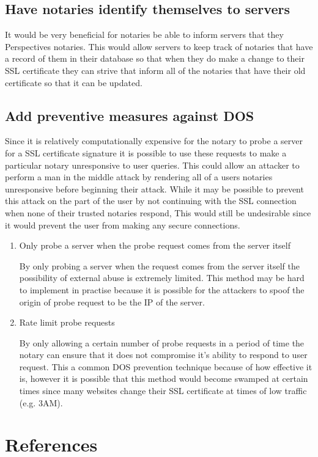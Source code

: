 \documentclass[preprint,review,12pt]{elsarticle}
\begin{document}
\subsection{Have notaries identify themselves to servers}

It would be very beneficial for notaries be able to inform servers that they
Perspectives notaries. This would allow servers to keep track of notaries
that have a record of them in their database so that when they do make a
change to their SSL certificate they can strive that inform all of the
notaries that have their old certificate so that it can be updated.

\subsection{Add preventive measures against DOS}

Since it is relatively computationally expensive for the notary to probe a
server for a SSL certificate signature it is possible to use these requests to
make a particular notary unresponsive to user queries. This could allow an
attacker to perform a man in the middle attack by rendering all of a users
notaries unresponsive before beginning their attack. While it may be possible
to prevent this attack on the part of the user by not continuing with the SSL
connection when none of their trusted notaries respond, This would still be
undesirable since it would prevent the user from making any secure connections.

\begin{enumerate}
    \item {Only probe a server when the probe request comes from the server itself}

        By only probing a server when the request comes from the server itself
        the possibility of external abuse is extremely limited. This method may
        be hard to implement in practise because it is possible for the
        attackers to spoof the origin of probe request to be the IP of the
        server.

    \item {Rate limit probe requests}

        By only allowing a certain number of probe requests in a period of time
        the notary can ensure that it does not compromise it's ability to
        respond to user request. This a common DOS prevention technique because
        of how effective it is, however it is possible that this method would
        become swamped at certain times since many websites change their SSL
        certificate at times of low traffic (e.g. 3AM).

\end{enumerate}

\section{References}
\label{references}
\nocite{*}


\end{document}
